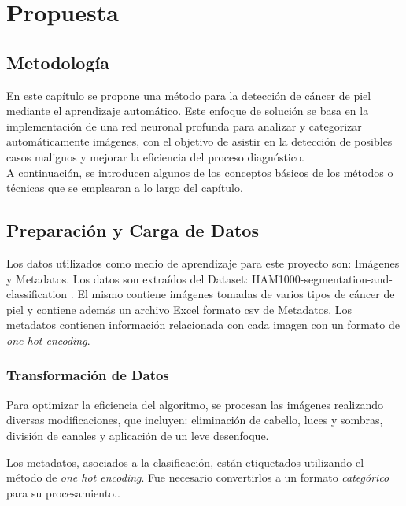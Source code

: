 \chapter{Propuesta}\label{chapter:proposal}

\section{Metodología}\label{sec:method}
 En este capítulo se propone una método para la detección de cáncer de piel mediante el aprendizaje automático. 
 Este enfoque de solución se basa
en la implementación de una  red neuronal profunda para analizar y categorizar automáticamente imágenes, con el objetivo de asistir 
en la detección de posibles casos malignos y mejorar la eficiencia del proceso diagnóstico. \\

A continuación, se introducen algunos de los conceptos básicos de los métodos o técnicas que se emplearan a lo largo del capítulo.

\section{Preparación y Carga de Datos}

 Los datos utilizados como medio de aprendizaje para este proyecto son: Imágenes y Metadatos. Los datos son extraídos del Dataset: HAM1000-segmentation-and-classification  \cite{ham10000}.
 El mismo contiene imágenes tomadas de varios tipos de cáncer de piel y contiene además un archivo Excel formato csv de Metadatos. Los metadatos contienen información relacionada con 
 cada imagen con un formato de \textit{one hot encoding}.

\subsection{Transformación de Datos}

Para optimizar la eficiencia del algoritmo, se procesan las imágenes realizando diversas modificaciones, que incluyen: 
eliminación de cabello, luces y sombras, división de canales y aplicación de un leve desenfoque.

Los metadatos, asociados a la clasificación, están etiquetados utilizando el método de \textit{one hot encoding}. 
Fue necesario convertirlos a un formato \textit{categórico} para su procesamiento..

